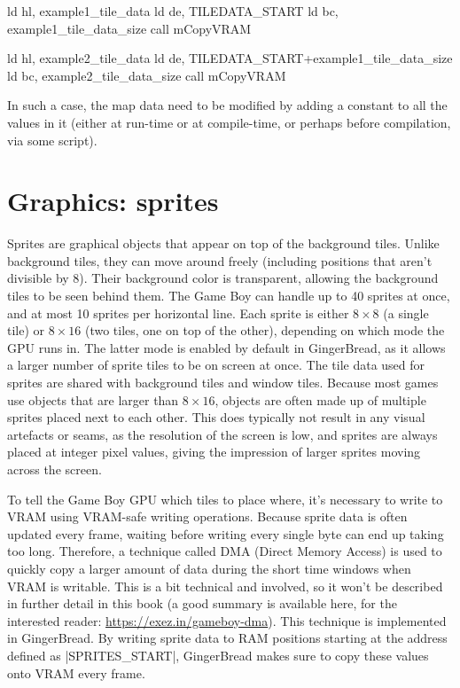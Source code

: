 \documentclass[11pt]{book}
\begin{document}
\begin{code}
ld hl, example1_tile_data
ld de, TILEDATA_START
ld bc, example1_tile_data_size
call mCopyVRAM

ld hl, example2_tile_data
ld de, TILEDATA_START+example1_tile_data_size
ld bc, example2_tile_data_size
call mCopyVRAM
\end{code}

In such a case, the map data need to be modified by adding a constant to all the values in it (either at run-time or at compile-time, or perhaps before compilation, via some script). 

\section{Graphics: sprites}
\label{sprites}
Sprites are graphical objects that appear on top of the background tiles. Unlike background tiles, they can move around freely (including positions that aren't divisible by 8). Their background color is transparent, allowing the background tiles to be seen behind them. The Game Boy can handle up to 40 sprites at once, and at most 10 sprites per horizontal line. Each sprite is either $8\times8$ (a single tile) or $8\times16$ (two tiles, one on top of the other), depending on which mode the GPU runs in. The latter mode is enabled by default in GingerBread, as it allows a larger number of sprite tiles to be on screen at once. The tile data used for sprites are shared with background tiles and window tiles. Because most games use objects that are larger than $8\times16$, objects are often made up of multiple sprites placed next to each other. This does typically not result in any visual artefacts or seams, as the resolution of the screen is low, and sprites are always placed at integer pixel values, giving the impression of larger sprites moving across the screen.

To tell the Game Boy GPU which tiles to place where, it's necessary to write to VRAM using VRAM-safe writing operations. Because sprite data is often updated every frame, waiting before writing every single byte can end up taking too long. Therefore, a technique called DMA (Direct Memory Access) is used to quickly copy a larger amount of data during the short time windows when VRAM is writable. This is a bit technical and involved, so it won’t be described in further detail in this book (a good summary is available here, for the interested reader: \url{https://exez.in/gameboy-dma}). This technique is implemented in GingerBread. By writing sprite data to RAM positions starting at the address defined as |SPRITES_START|, GingerBread makes sure to copy these values onto VRAM every frame.
\end{document}
